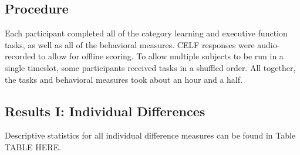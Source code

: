 \documentclass[../dissertation.tex]{subfiles}
\begin{document}
\subsection{Procedure}

Each participant completed all of the category learning and executive function tasks, as well as all of the behavioral measures. CELF responses were audio-recorded to allow for offline scoring. To allow multiple subjects to be run in a single timeslot, some participants received tasks in a shuffled order. All together, the tasks and behavioral measures took about an hour and a half.

\subsection{Results I: Individual Differences}

Descriptive statistics for all individual difference measures can be found in Table TABLE HERE.
\end{document}
